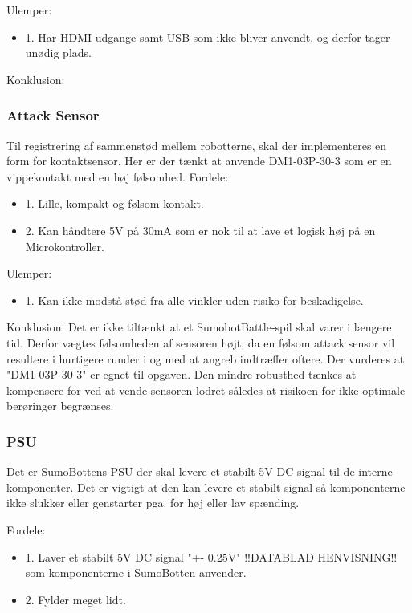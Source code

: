 Ulemper: 
\begin{itemize}
\item 1. Har HDMI udgange samt USB som ikke bliver anvendt, og derfor tager unødig plads.
\end{itemize}

Konklusion:

\subsubsection*{\textbf{Attack Sensor}}
Til registrering af sammenstød mellem robotterne, skal der implementeres en form for kontaktsensor.
Her er der tænkt at anvende DM1-03P-30-3  som er en vippekontakt med en høj følsomhed\cite{DM1-03P-30-3Data}.
Fordele: 
\begin{itemize}
\item 1. Lille, kompakt og følsom kontakt.
\item 2. Kan håndtere 5V på 30mA som er nok til at lave et logisk høj på en Microkontroller.
\end{itemize}

Ulemper: 
\begin{itemize}
\item 1. Kan ikke modstå stød fra alle vinkler uden risiko for beskadigelse.
\end{itemize}

Konklusion:
Det er ikke tiltænkt at et SumobotBattle-spil skal varer i længere tid. Derfor vægtes følsomheden af sensoren højt, da en følsom attack sensor vil resultere i hurtigere runder i og med at angreb indtræffer oftere. Der vurderes at "DM1-03P-30-3" er egnet til opgaven. Den mindre robusthed tænkes at kompensere for ved at vende sensoren lodret således at risikoen for ikke-optimale berøringer begrænses.

\subsubsection*{\textbf{PSU}}
Det er SumoBottens PSU der skal levere et stabilt 5V DC signal til de interne komponenter. Det er vigtigt at den kan levere et stabilt signal så komponenterne ikke slukker eller genstarter pga. for høj eller lav spænding.  

Fordele: 
\begin{itemize}
\item 1. Laver et stabilt 5V DC signal "+- 0.25V" !!DATABLAD HENVISNING!! som komponenterne i SumoBotten anvender.
\item 2. Fylder meget lidt. 
\end{itemize}

